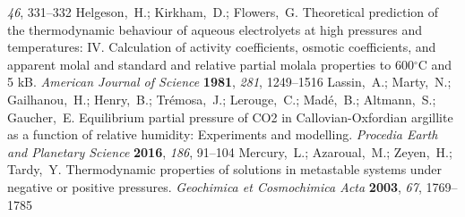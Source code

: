 \documentclass[aps,prl,twocolumn,superscriptaddress,groupedaddress]{revtex4}
\begin{document}
\begin{mcitethebibliography}{15}
  \emph{46}, 331--332\relax
\mciteBstWouldAddEndPuncttrue
\mciteSetBstMidEndSepPunct{\mcitedefaultmidpunct}
{\mcitedefaultendpunct}{\mcitedefaultseppunct}\relax
\EndOfBibitem
{}
Helgeson,~H.; Kirkham,~D.; Flowers,~G. Theoretical prediction of the
  thermodynamic behaviour of aqueous electrolyets at high pressures and
  temperatures: IV. Calculation of activity coefficients, osmotic coefficients,
  and apparent molal and standard and relative partial molala properties to
  600$^\circ$C and 5 kB. \emph{American Journal of Science} \textbf{1981},
  \emph{281}, 1249--1516\relax
\mciteBstWouldAddEndPuncttrue
\mciteSetBstMidEndSepPunct{\mcitedefaultmidpunct}
{\mcitedefaultendpunct}{\mcitedefaultseppunct}\relax
\EndOfBibitem
{}
Lassin,~A.; Marty,~N.; Gailhanou,~H.; Henry,~B.; Tr{\'e}mosa,~J.; Lerouge,~C.;
  Mad{\'e},~B.; Altmann,~S.; Gaucher,~E. Equilibrium partial pressure of CO2 in
  Callovian-Oxfordian argillite as a function of relative humidity: Experiments
  and modelling. \emph{Procedia Earth and Planetary Science} \textbf{2016},
  \emph{186}, 91--104\relax
\mciteBstWouldAddEndPuncttrue
\mciteSetBstMidEndSepPunct{\mcitedefaultmidpunct}
{\mcitedefaultendpunct}{\mcitedefaultseppunct}\relax
\EndOfBibitem
{}
Mercury,~L.; Azaroual,~M.; Zeyen,~H.; Tardy,~Y. Thermodynamic properties of
  solutions in metastable systems under negative or positive pressures.
  \emph{Geochimica et Cosmochimica Acta} \textbf{2003}, \emph{67},
  1769--1785\relax
\mciteBstWouldAddEndPuncttrue
\mciteSetBstMidEndSepPunct{\mcitedefaultmidpunct}
{\mcitedefaultendpunct}{\mcitedefaultseppunct}\relax
\EndOfBibitem
\end{mcitethebibliography}
\end{document}
